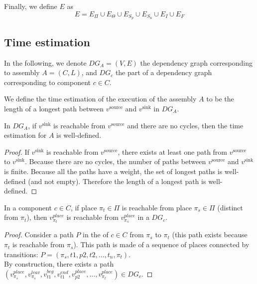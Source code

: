 

Finally, we define $E$ as 
\[
E=E_\Pi\cup E_{\Theta} \cup E_{S_p}\cup E_{S_u}\cup E_{I}\cup E_{F}
\]

\subsection{Time estimation}

In the following, we denote $DG_A=(V,E)$ the dependency graph corresponding
to assembly $A=(C,L)$, and $DG_c$ the part of a dependency graph
corresponding to component $c \in C$.

We define the time estimation of the execution of the \mad assembly $A$
to be the length of a longest path between $v^\text{source}$ and
$v^\text{sink}$ in $DG_A$.

\begin{lemma}
 In $DG_A$, if $v^\text{sink}$ is reachable from $v^\text{source}$ and there
 are no cycles, then the time estimation for $A$ is well-defined.
 \label{lemma:well_defined}
\end{lemma}

\begin{proof}
 If $v^\text{sink}$ is reachable from $v^\text{source}$, there exists at least
 one path from $v^\text{source}$ to  $v^\text{sink}$. Because there are no
 cycles, the number of paths between $v^\text{source}$ and $v^\text{sink}$ is
 finite. Because all the paths have a weight, the set of longest paths is
 well-defined (and not empty). Therefore the length of a longest path is
 well-defined.
\end{proof}

\begin{lemma}
 In a component $c \in C$, if place $\pi_t \in \Pi$ is reachable from place
 $\pi_s \in \Pi$ (distinct from $\pi_t$), then $v_{\pi_t}^{place}$
 is reachable from $v_{\pi_s}^{place}$ in a $DG_c$.
 \label{lemma:reachable}
\end{lemma}

\begin{proof}
 Consider a path $P$ in the \net of $c \in C$ from $\pi_s$ to
 $\pi_t$ (this path exists because $\pi_t$ is reachable from
 $\pi_s$). This path is made of a sequence of places connected by
 transitions: $P=(\pi_s,t1,p2,t2,\dots,t_n,\pi_t)$.\\
 By construction, there exists a path\\
 $(v_{\pi_s}^{place},v_{\pi_s}^{leav},v_{t1}^{beg},v_{t1}^{end},v_{p2}^{place},\dots,v_{\pi_t}^{place})
 \in DG_c$.
\end{proof}


